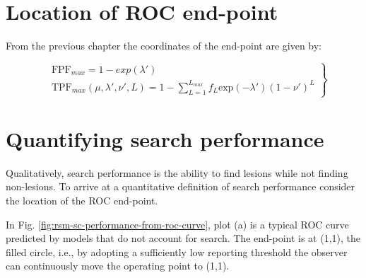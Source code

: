 \documentclass[
]{book}
\begin{document}
\hypertarget{rsm-sc-end-point}{%
\section{Location of ROC end-point}\label{rsm-sc-end-point}}

From the previous chapter the coordinates of the end-point are given by:

\begin{equation}
\left. 
\begin{aligned}
&\text{FPF}_{max} = 1 - exp\left (\lambda' \right ) \\
&\text{TPF}_{max} \left ( \mu, \lambda', \nu', L \right ) = 1 - \sum_{L=1}^{L_{max}}f_L\text{exp} \left ( - \lambda' \right ) \left ( 1 - \nu' \right )^L
\end{aligned}
\right \}
\label{eq:rsm-sc-FPF-TPF-max}
\end{equation}

\hypertarget{rsm-sc-quantifying}{%
\section{Quantifying search performance}\label{rsm-sc-quantifying}}

Qualitatively, search performance is the ability to find lesions while not finding non-lesions. To arrive at a quantitative definition of search performance consider the location of the ROC end-point.

In Fig. \ref{fig:rsm-sc-performance-from-roc-curve}, plot (a) is a typical ROC curve predicted by models that do not account for search. The end-point is at (1,1), the filled circle, i.e., by adopting a sufficiently low reporting threshold the observer can continuously move the operating point to (1,1).
\end{document}
